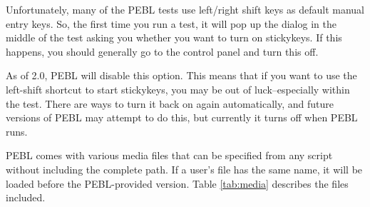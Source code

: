 Unfortunately, many of the PEBL tests use left/right shift keys as default manual entry keys. So, the first time you run a test, it will pop up the dialog in the middle of the test asking you whether you want to turn on stickykeys.  If this happens, you should generally go to the control panel and turn this off.

As of 2.0, PEBL will disable this option.  This means that if you want to use the left-shift shortcut to start stickykeys, you may be out of luck--especially within the test.  There are ways to turn it back on again automatically, and future versions of PEBL may attempt to do this, but currently it turns off when PEBL runs.



\label{sec:media}

PEBL comes with various media files that can be specified from 
any script without including the complete path.  If a user's file has
the same name, it will be loaded before the PEBL-provided version.
Table \ref{tab:media} describes the files included.
\vspace{1cm}


